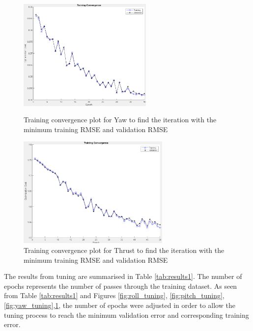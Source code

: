 \begin{figure}[H]
    \centering
    \begin{minipage}[b]{0.45\textwidth}
        \centering
        \includegraphics[height=5.5cm,keepaspectratio]{img/yaw_tuning.png}
        \caption{Training convergence plot for Yaw to find the iteration with the minimum training RMSE and validation RMSE}
        \label{fig:yaw_tuning}
    \end{minipage}
    \hfill
    \begin{minipage}[b]{0.45\textwidth}
        \centering
        \includegraphics[height=5.5cm,keepaspectratio]{img/thrust_tuning.png}
        \caption{Training convergence plot for Thrust to find the iteration with the minimum training RMSE and validation RMSE}
        \label{fig:thrust_tuning}
    \end{minipage}
\end{figure}
The results from tuning are summarised in Table \ref{tab:results1}. The number of epochs represents the number of passes through the training dataset. As seen from Table \ref{tab:results1} and Figures \ref{fig:roll_tuning}, \ref{fig:pitch_tuning}, \ref{fig:yaw_tuning},\ref{fig:thrust_tuning}, the number of epochs were adjusted in order to allow the tuning process to reach the minimum validation error and corresponding training error. 
